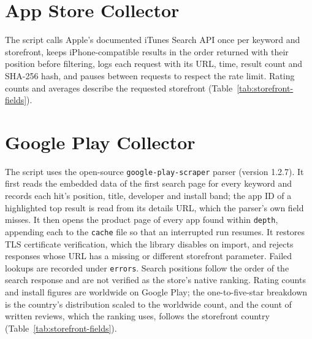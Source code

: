 \par\medskip\noindent
\begin{minipage}{\linewidth}

\end{minipage}
\par\medskip

\noindent
\begin{minipage}{\linewidth}

\end{minipage}
\par\medskip

\section{App Store Collector}
The script calls Apple's documented iTunes Search API once per keyword and
storefront, keeps iPhone-compatible results in the order returned with their
position before filtering, logs each request with its URL, time, result count and
SHA-256 hash, and pauses between requests to respect the rate limit. Rating counts
and averages describe the requested storefront (Table~\ref{tab:storefront-fields}).



\section{Google Play Collector}
The script uses the open-source \texttt{google-play-scraper} parser (version
1.2.7). It first reads the embedded data of the first search page for every
keyword and records each hit's position, title, developer and install band; the
app ID of a highlighted top result is read from its details URL, which the
parser's own field misses. It then opens the product page of every app found
within \texttt{depth}, appending each to the \texttt{cache} file so that an
interrupted run resumes. It restores TLS certificate verification, which the
library disables on import, and rejects responses whose URL has a missing or
different storefront parameter.
Failed lookups are recorded under \texttt{errors}. Search positions follow the
order of the search response and are not verified as the store's native
ranking. Rating counts and install figures are worldwide on Google Play; the
one-to-five-star breakdown is the country's distribution scaled to the
worldwide count, and the count of written reviews, which the ranking uses,
follows the storefront country (Table~\ref{tab:storefront-fields}).

